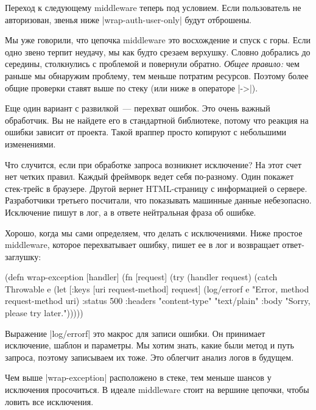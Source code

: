 Переход к следующему middleware теперь под условием. Если пользователь не
авторизован, звенья ниже \spverb|wrap-auth-user-only| будут отброшены.

Мы уже говорили, что цепочка middleware это восхождение и спуск с горы. Если
одно звено терпит неудачу, мы как будто срезаем верхушку. Словно добрались до
середины, столкнулись с проблемой и повернули обратно. \emph{Общее правило:} чем
раньше мы обнаружим проблему, тем меньше потратим ресурсов. Поэтому более общие
проверки ставят выше по стеку (или ниже в операторе \spverb|->|).

Еще один вариант с развилкой~--- перехват ошибок. Это очень важный
обработчик. Вы не найдете его в стандартной библиотеке, потому что реакция на
ошибки зависит от проекта. Такой враппер просто копируют с небольшими
изменениями.

Что случится, если при обработке запроса возникнет исключение? На этот счет нет
четких правил. Каждый фреймворк ведет себя по-разному. Один покажет стек-трейс в
браузере. Другой вернет HTML-страницу с информацией о сервере. Разработчики
третьего посчитали, что показывать машинные данные небезопасно. Исключение пишут
в лог, а в ответе нейтральная фраза об ошибке.

Хорошо, когда мы сами определяем, что делать с исключениями. Ниже простое
middleware, которое перехватывает ошибку, пишет ее в лог и возвращает
ответ-заглушку:

\begin{english}
  \begin{clojure}
(defn wrap-exception [handler]
  (fn [request]
    (try
      (handler request)
      (catch Throwable e
        (let [{:keys [uri
                      request-method]} request]
          (log/errorf e "Error, method %
                      request-method uri)
          {:status 500
           :headers {"content-type" "text/plain"}
           :body "Sorry, please try later."})))))
  \end{clojure}
\end{english}

Выражение \spverb|log/errorf| это макрос для записи ошибки. Он принимает
исключение, шаблон и параметры. Мы хотим знать, какие были метод и путь запроса,
поэтому записываем их тоже. Это облегчит анализ логов в будущем.

Чем выше \spverb|wrap-exception| расположено в стеке, тем меньше шансов у
исключения просочиться. В идеале middleware стоит на вершине цепочки, чтобы
ловить все исключения.

